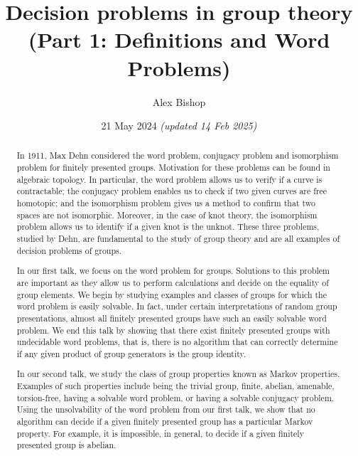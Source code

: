 \documentclass[11pt,a4paper,reqno]{amsart}
\theoremstyle{plain}
\theoremstyle{definition}
\theoremstyle{definition}
\begin{document}
\title{Decision problems in group theory\\(Part 1: Definitions and Word Problems)}
\author{Alex Bishop}
\date{21 May 2024 \textit{(updated 14 Feb 2025)}}
\address{%
	Section de mathématiques\\
	Université de Genève\\
	rue du Conseil-Général~7-9\\
	1205 Genève, Switzerland}

\begin{abstract}
	In 1911, Max Dehn considered the word problem, conjugacy problem and isomorphism problem for finitely presented groups. Motivation for these problems can be found in algebraic topology. In particular, the word problem allows us to verify if a curve is contractable; the conjugacy problem enables us to check if two given curves are free homotopic; and the isomorphism problem gives us a method to confirm that two spaces are not isomorphic. Moreover, in the case of knot theory, the isomorphism problem allows us to identify if a given knot is the unknot. These three problems, studied by Dehn, are fundamental to the study of group theory and are all examples of decision problems of groups.

	In our first talk, we focus on the word problem for groups. Solutions to this problem are important as they allow us to perform calculations and decide on the equality of group elements. We begin by studying examples and classes of groups for which the word problem is easily solvable. In fact, under certain interpretations of random group presentations, almost all finitely presented groups have such an easily solvable word problem. We end this talk by showing that there exist finitely presented groups with undecidable word problems, that is, there is no algorithm that can correctly determine if any given product of group generators is the group identity.

	In our second talk, we study the class of group properties known as Markov properties. Examples of such properties include being the trivial group, finite, abelian, amenable, torsion-free, having a solvable word problem, or having a solvable conjugacy problem. Using the unsolvability of the word problem from our first talk, we show that no algorithm can decide if a given finitely presented group has a particular Markov property. For example, it is impossible, in general, to decide if a given finitely presented group is abelian.
\end{abstract}
\maketitle
\end{document}
